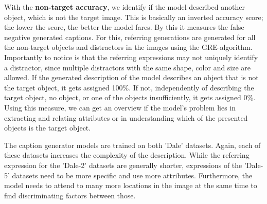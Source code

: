 With the \textbf{non-target accuracy}, we identify if the model described another object, which is not the target image.
This is basically an inverted accuracy score; the lower the score, the better the model fares.
By this it measures the false negative generated captions.
For this, referring generations are generated for all the non-target objects and distractors in the images using the GRE-algorithm.
Importantly to notice is that the referring expressions may not uniquely identify a distractor, since multiple distractors with the same shape, color and size are allowed.
If the generated description of the model describes an object that is not the target object, it gets assigned 100\%.
If not, independently of describing the target object, no object, or one of the objects insufficiently, it gets assigned 0\%.
Using this measure, we can get an overview if the model's problem lies in extracting and relating attributes or in understanding which of the presented objects is the target object.

The caption generator models are trained on both 'Dale' datasets.
Again, each of these datasets increases the complexity of the description.
While the referring expression for the 'Dale-2' datasets are generally shorter, expressions of the 'Dale-5' datasets need to be more specific and use more attributes.
Furthermore, the model needs to attend to many more locations in the image at the same time to find discriminating factors between those.

